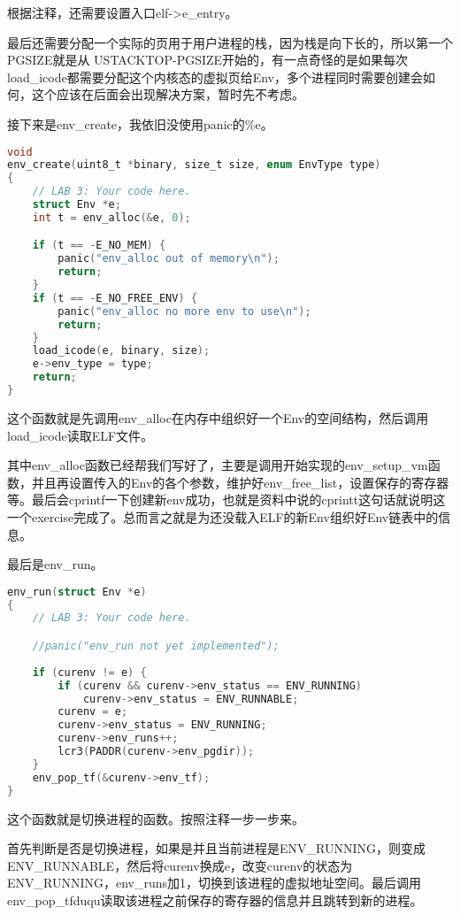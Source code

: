 \documentclass[11pt,a4paper]{article}
\begin{document}
根据注释，还需要设置入口elf->e\_entry。

最后还需要分配一个实际的页用于用户进程的栈，因为栈是向下长的，所以第一个PGSIZE就是从 USTACKTOP-PGSIZE开始的，有一点奇怪的是如果每次load\_icode都需要分配这个内核态的虚拟页给Env，多个进程同时需要创建会如何，这个应该在后面会出现解决方案，暂时先不考虑。

接下来是env\_create，我依旧没使用panic的\%e。

\setmainfont{Consolas}
\begin{lstlisting}[language={C},firstnumber=1,title=kern/env.c] 
void
env_create(uint8_t *binary, size_t size, enum EnvType type)
{
	// LAB 3: Your code here.
	struct Env *e;
	int t = env_alloc(&e, 0);

	if (t == -E_NO_MEM) {
		panic("env_alloc out of memory\n");
		return;
	}
	if (t == -E_NO_FREE_ENV) {
		panic("env_alloc no more env to use\n");
		return;
	}
	load_icode(e, binary, size);
	e->env_type = type;
	return;
}
\end{lstlisting}
\setmainfont[BoldFont=黑体]{宋体}

这个函数就是先调用env\_alloc在内存中组织好一个Env的空间结构，然后调用load\_icode读取ELF文件。

其中env\_alloc函数已经帮我们写好了，主要是调用开始实现的env\_setup\_vm函数，并且再设置传入的Env的各个参数，维护好env\_free\_list，设置保存的寄存器等。最后会cprintf一下创建新env成功，也就是资料中说的cprintt这句话就说明这一个exercise完成了。总而言之就是为还没载入ELF的新Env组织好Env链表中的信息。

最后是env\_run。


\setmainfont{Consolas}
\begin{lstlisting}[language={C},firstnumber=1,title=kern/env.c] 
env_run(struct Env *e)
{
	// LAB 3: Your code here.

	//panic("env_run not yet implemented");
	
	if (curenv != e) {
		if (curenv && curenv->env_status == ENV_RUNNING)
			curenv->env_status = ENV_RUNNABLE;
		curenv = e;
		curenv->env_status = ENV_RUNNING;
		curenv->env_runs++;
		lcr3(PADDR(curenv->env_pgdir));
	}
	env_pop_tf(&curenv->env_tf);
}
\end{lstlisting}
\setmainfont[BoldFont=黑体]{宋体}

这个函数就是切换进程的函数。按照注释一步一步来。

首先判断是否是切换进程，如果是并且当前进程是ENV\_RUNNING，则变成ENV\_RUNNABLE，然后将curenv换成e，改变curenv的状态为ENV\_RUNNING，env\_runs加1，切换到该进程的虚拟地址空间。最后调用env\_pop\_tfduqu读取该进程之前保存的寄存器的信息并且跳转到新的进程。
\end{document}
